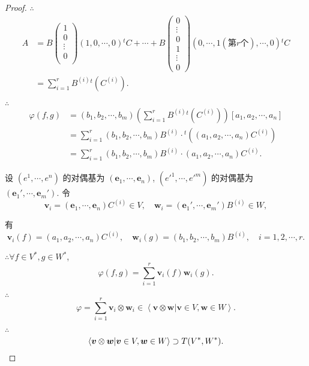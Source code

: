\documentclass[color=black,device=normal,lang=cn,mode=geye]{elegantnote}
\begin{document}
\begin{proof}
    $\therefore$
    \begin{align*}
        A & =B\begin{pmatrix}
            1 \\
            0 \\
            \vdots \\
            0 \\
        \end{pmatrix}(1,0,\cdots,0){}^tC+\cdots+B\begin{pmatrix}
            0 \\
            \vdots \\
            0 \\
            1 \\
            \vdots \\
            0
        \end{pmatrix}(0,\cdots,1(\text{第}r\text{个}),\cdots,0){}^tC \\
        & =\sum\limits_{i=1}^rB^{(i)}{}^t(C^{(i)}).
    \end{align*}

    $\therefore$
    \begin{align*}
        \varphi(f,g) & =(b_1,b_2,\cdots,b_m)\left(\sum\limits_{i=1}^rB^{(i)}{}^t(C^{(i)})\right)[a_1,a_2,\cdots,a_n] \\
        & =\sum\limits_{i=1}^r(b_1,b_2,\cdots,b_m)B^{(i)}\cdot{}^t((a_1,a_2,\cdots,a_n)C^{(i)}) \\
        & =\sum\limits_{i=1}^r(b_1,b_2,\cdots,b_m)B^{(i)}\cdot(a_1,a_2,\cdots,a_n)C^{(i)}.
    \end{align*}

    设 $(e^1,\cdots,e^n)$ 的对偶基为 $(\boldsymbol{e}_1,\cdots,\boldsymbol{e}_n)$, $(e'^1,\cdots,e'^m)$ 的对偶基为 $(\boldsymbol{e}_1',\cdots,\boldsymbol{e}_m')$. 令
    \[\boldsymbol{v}_i=(\boldsymbol{e}_1,\cdots,\boldsymbol{e}_n)C^{(i)}\in V,\quad\boldsymbol{w}_i=(\boldsymbol{e}_1',\cdots,\boldsymbol{e}_m')B^{(i)}\in W,\]
    
    有
    \[\boldsymbol{v}_i(f)=(a_1,a_2,\cdots,a_n)C^{(i)},\quad\boldsymbol{w}_i(g)=(b_1,b_2,\cdots,b_m)B^{(i)},\quad i=1,2,\cdots,r.\]

    $\therefore\forall f\in V^*,g\in W^*$,
    \[\varphi(f,g)=\sum\limits_{i=1}^r\boldsymbol{v}_i(f)\boldsymbol{w}_i(g).\]

    $\therefore$
    \[\varphi=\sum\limits_{i=1}^r\boldsymbol{v}_i\otimes\boldsymbol{w}_i\in\left<\boldsymbol{v}\otimes\boldsymbol{w}|\boldsymbol{v}\in V,\boldsymbol{w}\in W\right>.\]

    $\therefore$
    \[\left<\boldsymbol{v}\otimes\boldsymbol{w}|\boldsymbol{v}\in V,\boldsymbol{w}\in W\right>\supset T(V^*,W^*).\qedhere\]
\end{proof}
\end{document}
